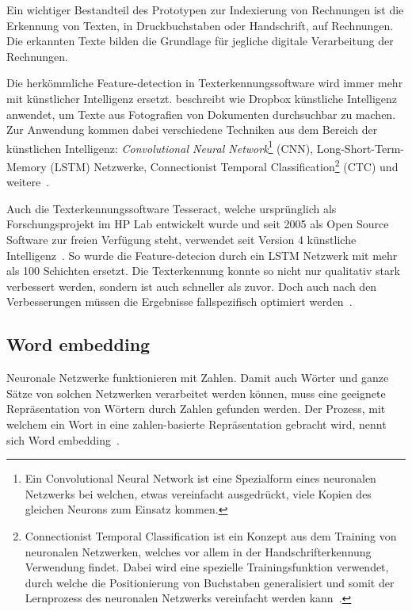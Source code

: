 Ein wichtiger Bestandteil des Prototypen zur Indexierung von Rechnungen ist die Erkennung von Texten, in Druckbuchstaben oder Handschrift, auf Rechnungen. Die erkannten Texte bilden die Grundlage für jegliche digitale Verarbeitung der Rechnungen.

Die herkömmliche Feature-detection in Texterkennungssoftware wird immer mehr mit künstlicher Intelligenz ersetzt. \textcite{Neuberg2017} beschreibt wie Dropbox künstliche Intelligenz anwendet, um Texte aus Fotografien von Dokumenten durchsuchbar zu machen. Zur Anwendung kommen dabei verschiedene Techniken aus dem Bereich der künstlichen Intelligenz: \textit{Convolutional Neural Network}\footnote{Ein Convolutional Neural Network ist eine Spezialform eines neuronalen Netzwerks bei welchen, etwas vereinfacht ausgedrückt, viele Kopien des gleichen Neurons zum Einsatz kommen\autocite{Olah2014}.} (CNN), Long-Short-Term-Memory (LSTM) Netzwerke, Connectionist Temporal Classification\footnote{Connectionist Temporal Classification ist ein Konzept aus dem Training von neuronalen Netzwerken, welches vor allem in der Handschrifterkennung Verwendung findet. Dabei wird eine spezielle Trainingsfunktion verwendet, durch welche die Positionierung von Buchstaben generalisiert und somit der Lernprozess des neuronalen Netzwerks vereinfacht werden kann~\autocite{Scheidl2018}.} (CTC) und weitere~\autocite{Neuberg2017}.

Auch die Texterkennungssoftware Tesseract, welche ursprünglich als Forschungsprojekt im HP Lab entwickelt wurde und seit 2005 als Open Source Software zur freien Verfügung steht, verwendet seit Version 4 künstliche Intelligenz~\autocite{Smith2007}. So wurde die Feature-detecion durch ein LSTM Netzwerk mit mehr als 100 Schichten ersetzt. Die Texterkennung konnte so nicht nur qualitativ stark verbessert werden, sondern ist auch schneller als zuvor. Doch auch nach den Verbesserungen müssen die Ergebnisse fallspezifisch optimiert werden~\autocite{O.V.2018, O.V.2018a}.

\subsection{Word embedding}
\label{chap:embedding}

Neuronale Netzwerke funktionieren mit Zahlen. Damit auch Wörter und ganze Sätze von solchen Netzwerken verarbeitet werden können, muss eine geeignete Repräsentation von Wörtern durch Zahlen gefunden werden. Der Prozess, mit welchem ein Wort in eine zahlen-basierte Repräsentation gebracht wird, nennt sich Word embedding~\autocite{Olah2014b}.

